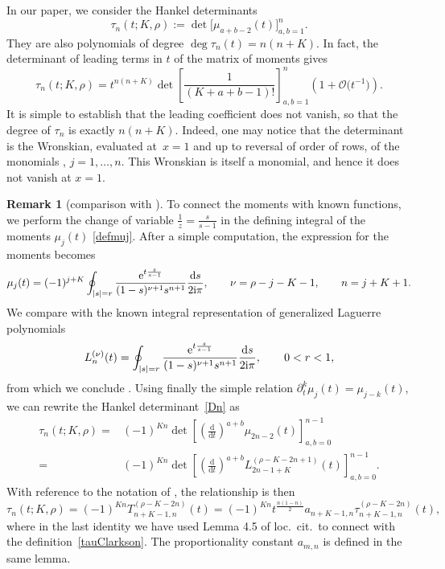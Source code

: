 \documentclass[10pt,a4paper]{amsart}
\numberwithin{equation}{section}
\theoremstyle{definition}
\newtheorem{Remark}[Theorem]{Remark}
\def\le{\left}
\def\ri{\right}
\def \d{{\mathrm d}}
\def\be{\begin{equation}}
\def\ee{\end{equation}}
\def\pa{\partial}
\begin{document}
In our paper, we consider the Hankel determinants
\be
\label{Dn}
\tau_n(t; {K}, {\rho} ):= \det \bigl[\mu_{a+b-2}(t)\bigr]_{a,b=1}^n.
\ee
They are also polynomials of degree
$
\deg \tau_n(t) = n(n+{K})$.
In fact, the determinant of leading terms in $t$ of the matrix of moments gives
\[
\tau_n(t; {K}, {\rho}) = t^{n(n+{K})} \det \le[\frac 1{( {K} + a+b-1)!} \ri]_{a,b=1}^n \le(1 + \mathcal O\bigl(t^{-1}\bigr)\ri).
\]
 It is simple to establish that the leading coefficient does not vanish, so that the degree of $\tau_n$ is exactly $n(n+{K})$. Indeed, one may notice that the determinant is the Wronskian, evaluated at~${x=1}$ and up to reversal of order of rows, of the monomials
, $j=1,\dots, n$. This Wronskian is itself a monomial, and hence it does not vanish at $x=1$.

\begin{Remark}[comparison with \cite{ClarksonDunning}]\label{CDcomp}
To connect the moments with known functions, we perform the change of variable $\frac 1 z = \frac s{s-1}$ in the defining integral of the moments $\mu_j(t)$ \eqref{defmuj}. After a simple computation, the expression for the moments becomes
\[
\mu_j(t) = (-1)^{j+{K}} \oint_{|s|= r} \frac { {\rm e}^{t \frac s{s-1}}}{(1-s)^{\nu + 1} s^{n+1}} \frac{\d s}{2{\rm i}\pi}, \qquad \nu = {\rho}-j-{K}-1,\qquad n = j + {K}+1.
\]
We compare with the known integral representation of generalized Laguerre polynomials
\[
L^{(\nu)}_n(t) = \oint_{|s|=r} \frac{{\rm e}^{t \frac s{s-1}}}{(1-s)^{\nu+1} s^{n+1}} \frac{ \d s}{2{\rm i}\pi},
\qquad 0<r<1,
\]
from which we conclude
.
Using finally the simple relation $\pa_t^k \mu_j(t) \allowbreak= \mu_{j-k}(t)$, we can rewrite the Hankel determinant~\eqref{Dn} as
\begin{align*}
\tau_n(t; {K}, {\rho}) = {}&(-1)^{ {K} n} \det \le[ \le(\frac{\d}{\d t} \ri)^{a+b}\mu_{2n-2}(t)
\ri]_{a,b=0}^{n-1}\\
={}& (-1)^{ {K} n} \det \le[ \le(\frac{\d}{\d t} \ri)^{a+b} L^{ ({\rho}-{K} - 2n+1)} _{2n-1 + {K}} (t)
\ri]_{a,b=0}^{n-1}.
\end{align*}
With reference to the notation of \cite[Definition 3.1]{ClarksonDunning}, the relationship is then
\[
\tau_n(t; {K}, {\rho})= (-1)^{ {K} n} T^{({\rho}-{K} - 2n)}_{n+ {K}-1, n}(t)= (-1)^{ {K} n} t^{\frac{n(1-n)}2} a_{n+ {K}-1,n}
\tau^{({\rho}-{K} - 2n)}_{n+ {K}-1, n}(t),
\]
where in the last identity we have used Lemma 4.5 of loc.\ cit.\ to connect with the definition~\eqref{tauClarkson}. The proportionality constant $a_{m,n}$ is defined in the same lemma.
\end{Remark}
\end{document}
